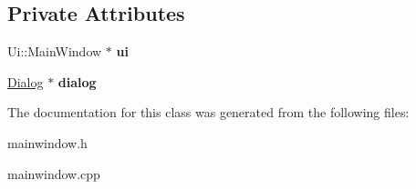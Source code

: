\subsection*{Private Attributes}
\begin{DoxyCompactItemize}
\item 
\mbox{\label{classMainWindow_a35466a70ed47252a0191168126a352a5}} 
Ui\+::\+Main\+Window $\ast$ {\bfseries ui}
\item 
\mbox{\label{classMainWindow_a029f5f35facf7120bbf42e54dbd25a40}} 
\hyperlink{classDialog}{Dialog} $\ast$ {\bfseries dialog}
\end{DoxyCompactItemize}


The documentation for this class was generated from the following files\+:\begin{DoxyCompactItemize}
\item 
mainwindow.\+h\item 
mainwindow.\+cpp\end{DoxyCompactItemize}
